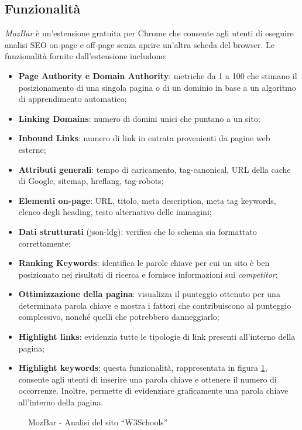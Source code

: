 \subsection{Funzionalità}
\textit{MozBar} è un'estensione gratuita per Chrome che consente agli utenti di eseguire analisi SEO \gls{on-page} e \gls{off-page} senza aprire un'altra scheda del browser. Le funzionalità fornite dall'estensione includono:
\begin{itemize}
    \item \textbf{Page Authority e Domain Authority}: metriche da 1 a 100 che stimano il posizionamento di una singola pagina o di un dominio in base a un algoritmo di apprendimento automatico;
    \item \textbf{Linking Domains}: numero di domini unici che puntano a un sito;
    \item \textbf{Inbound Links}: numero di link in entrata provenienti da pagine web esterne;
    \item \textbf{Attributi generali}: tempo di caricamento, \gls{tag-canonical}, URL della cache di Google, \gls{sitemap}, \gls{hreflang}, \gls{tag-robots};
    \item \textbf{Elementi on-page}: URL, titolo, meta description, meta tag keywords, elenco degli heading, testo alternativo delle immagini;
    \item \textbf{Dati strutturati} (\gls{json-ldg}): verifica che lo schema sia formattato correttamente;
    \item \textbf{Ranking Keywords}: identifica le parole chiave per cui un sito è ben posizionato nei risultati di ricerca e fornisce informazioni sui \textit{competitor};
    \item \textbf{Ottimizzazione della pagina}: visualizza il punteggio ottenuto per una determinata parola chiave e mostra i fattori che contribuiscono al punteggio complessivo, nonché quelli che potrebbero danneggiarlo;
    \item \textbf{Highlight links}: evidenzia tutte le tipologie di link presenti all'interno della pagina;
    \item \textbf{Highlight keywords}: questa funzionalità, rappresentata in figura \ref{fig:mozbar}, consente agli utenti di inserire una parola chiave e ottenere il numero di occorrenze. Inoltre, permette di evidenziare graficamente una parola chiave all'interno della pagina.
\end{itemize}

\begin{figure}[H]
    \centering 
    \caption{MozBar - Analisi del sito “W3Schools”}
    \label{fig:mozbar}
\end{figure}

